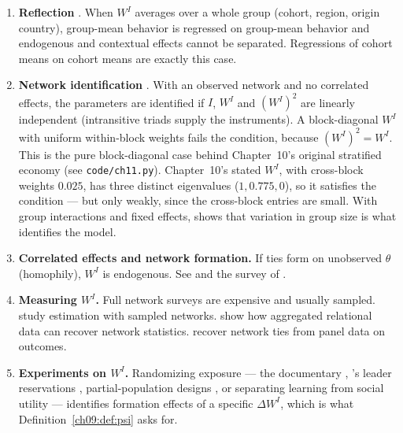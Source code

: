 \documentclass[../structural_economics_book.tex]{subfiles}
\begin{document}
\begin{enumerate}
\item \textbf{Reflection} \citep{manski1993identification}. When $W^I$ averages over a whole group (cohort, region, origin country), group-mean behavior is regressed on group-mean behavior and endogenous and contextual effects cannot be separated. Regressions of cohort means on cohort means are exactly this case.
\item \textbf{Network identification} \citep{bramoulle2009identification}. With an observed network and no correlated effects, the parameters are identified if $I$, $W^I$ and $(W^I)^2$ are linearly independent (intransitive triads supply the instruments). A block-diagonal $W^I$ with uniform within-block weights fails the condition, because $(W^I)^2 = W^I$. This is the pure block-diagonal case behind Chapter~10's original stratified economy (see \texttt{code/ch11.py}). Chapter~10's stated $W^I$, with cross-block weights $0.025$, has three distinct eigenvalues ($1, 0.775, 0$), so it satisfies the condition --- but only weakly, since the cross-block entries are small. With group interactions and fixed effects, \citet{lee2007identification} shows that variation in group size is what identifies the model.
\item \textbf{Correlated effects and network formation.} If ties form on unobserved $\theta$ (homophily), $W^I$ is endogenous. See \citet[\textit{JBES}]{goldsmithpinkham2013social} and the survey of \citet{blume2011identification}.
\item \textbf{Measuring $W^I$.} Full network surveys are expensive and usually sampled. \citet{chandrasekhar2016econometrics} study estimation with sampled networks. \citet[\textit{AER}]{breza2020using} show how aggregated relational data can recover network statistics. \citet{depaula2025identifying} recover network ties from panel data on outcomes.
\item \textbf{Experiments on $W^I$.} Randomizing exposure --- the \citeauthor{bernard2014future} documentary \citeyearpar{bernard2014future}, \citeauthor{beaman2012female}'s leader reservations \citeyearpar{beaman2012female}, partial-population designs \citep{moffitt2001policy}, or separating learning from social utility \citep{bursztyn2014understanding} --- identifies formation effects of a specific $\Delta W^I$, which is what Definition~\ref{ch09:def:psi} asks for.
\end{enumerate}


\end{document}
